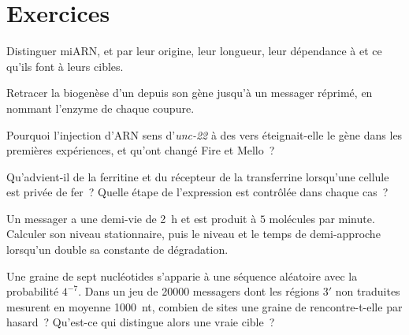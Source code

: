 \section{Exercices}

\begin{exercise}[$\star$]\label{exo:b3:rna-regulation:1}
Distinguer miARN,  et  par leur origine, leur longueur, leur
dépendance à  et ce qu'ils font à leurs cibles.
\end{exercise}

\begin{exercise}[$\star$]\label{exo:b3:rna-regulation:2}
Retracer la biogenèse d'un  depuis son gène jusqu'à un messager
réprimé, en nommant l'enzyme de chaque coupure.
\end{exercise}

\begin{exercise}[$\star$]\label{exo:b3:rna-regulation:3}
Pourquoi l'injection d'ARN sens d'\emph{unc-22} à des vers
éteignait-elle le gène dans les premières expériences, et qu'ont changé
Fire et Mello~?
\end{exercise}

\begin{exercise}[$\star$]\label{exo:b3:rna-regulation:4}
Qu'advient-il de la ferritine et du récepteur de la transferrine
lorsqu'une cellule est privée de fer~? Quelle étape de l'expression est
contrôlée dans chaque cas~?
\end{exercise}

\begin{exercise}[$\star\star$]\label{exo:b3:rna-regulation:5}
Un messager a une demi-vie de \qty{2}{h} et est produit à $5$ molécules
par minute. Calculer son niveau stationnaire, puis le niveau et le
temps de demi-approche lorsqu'un  double sa constante de
dégradation.
\end{exercise}

\begin{exercise}[$\star\star$]\label{exo:b3:rna-regulation:6}
Une graine de sept nucléotides s'apparie à une séquence aléatoire avec
la probabilité $4^{-7}$. Dans un jeu de \num{20000} messagers dont les
régions 3$'$ non traduites mesurent en moyenne \qty{1000}{nt}, combien
de sites une graine de  rencontre-t-elle par hasard~? Qu'est-ce
qui distingue alors une vraie cible~?
\end{exercise}

